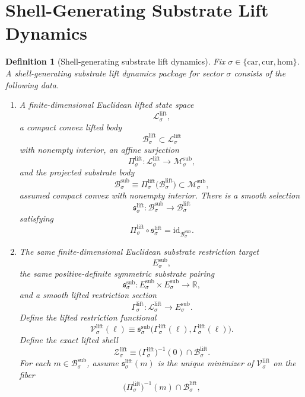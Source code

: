 \documentclass[11pt]{article}
\newcommand{\Car}{\mathrm{car}}
\newcommand{\Cur}{\mathrm{cur}}
\newcommand{\Hom}{\mathrm{hom}}
\newcommand{\SubSpace}[1]{\mathcal M_{#1}^{\mathrm{sub}}}
\newcommand{\SubBody}[1]{\mathcal B_{#1}^{\mathrm{sub}}}
\newcommand{\SubTarget}[1]{E_{#1}^{\mathrm{sub}}}
\newcommand{\SubPair}[1]{\mathfrak s_{#1}^{\mathrm{sub}}}
\newcommand{\LiftSpace}[1]{\mathcal L_{#1}^{\mathrm{lift}}}
\newcommand{\LiftBody}[1]{\mathcal B_{#1}^{\mathrm{lift}}}
\newcommand{\LiftProj}[1]{\Pi_{#1}^{\mathrm{lift}}}
\newcommand{\LiftSelect}[1]{\mathfrak s_{#1}^{\mathrm{lift}}}
\newcommand{\LiftSection}[1]{\Gamma_{#1}^{\mathrm{lift}}}
\newcommand{\LiftFunctional}[1]{\mathscr V_{#1}^{\mathrm{lift}}}
\newcommand{\LiftShellSet}[1]{\mathcal Z_{#1}^{\mathrm{lift}}}
\newtheorem{definition}{Definition}
\begin{document}
\section{Shell-Generating Substrate Lift Dynamics}

\begin{definition}[Shell-generating substrate lift dynamics]
\label{def:lift}
Fix \(\sigma\in\{\Car,\Cur,\Hom\}\). A \emph{shell-generating substrate lift dynamics package} for sector \(\sigma\) consists of the following data.
\begin{enumerate}
    \item A finite-dimensional Euclidean lifted state space
    \[
    \LiftSpace{\sigma},
    \]
    a compact convex lifted body
    \[
    \LiftBody{\sigma}\subset\LiftSpace{\sigma}
    \]
    with nonempty interior, an affine surjection
    \[
    \LiftProj{\sigma}:\LiftSpace{\sigma}\to\SubSpace{\sigma},
    \]
    and the projected substrate body
    \[
    \SubBody{\sigma}
    \equiv
    \LiftProj{\sigma}\bigl(\LiftBody{\sigma}\bigr)
    \subset \SubSpace{\sigma},
    \]
    assumed compact convex with nonempty interior. There is a smooth selection
    \[
    \LiftSelect{\sigma}:\SubBody{\sigma}\to\LiftBody{\sigma}
    \]
    satisfying
    \[
    \LiftProj{\sigma}\circ\LiftSelect{\sigma}
    =
    \mathrm{id}_{\SubBody{\sigma}}.
    \]
    \item The same finite-dimensional Euclidean substrate restriction target
    \[
    \SubTarget{\sigma},
    \]
    the same positive-definite symmetric substrate pairing
    \[
    \SubPair{\sigma}:
    \SubTarget{\sigma}\times\SubTarget{\sigma}\to\mathbb R,
    \]
    and a smooth lifted restriction section
    \[
    \LiftSection{\sigma}:\LiftSpace{\sigma}\to\SubTarget{\sigma}.
    \]
    Define the lifted restriction functional
    \begin{equation}
    \LiftFunctional{\sigma}(\ell)
    \equiv
    \SubPair{\sigma}\bigl(\LiftSection{\sigma}(\ell),\LiftSection{\sigma}(\ell)\bigr).
    \label{eq:liftfunctional}
    \end{equation}
    Define the exact lifted shell
    \begin{equation}
    \LiftShellSet{\sigma}
    \equiv
    \bigl(\LiftSection{\sigma}\bigr)^{-1}(0)\cap\LiftBody{\sigma}.
    \label{eq:liftshell}
    \end{equation}
    For each \(m\in\SubBody{\sigma}\), assume \(\LiftSelect{\sigma}(m)\) is the unique minimizer of \(\LiftFunctional{\sigma}\) on the fiber
    \[
    \bigl(\LiftProj{\sigma}\bigr)^{-1}(m)\cap\LiftBody{\sigma},
\]
\end{enumerate}
\end{definition}
\end{document}
